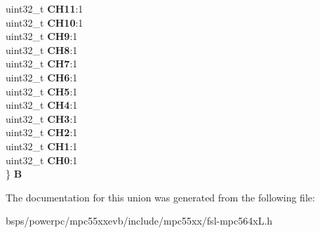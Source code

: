 \begin{DoxyCompactItemize}
\begin{tabbing}
\>uint32\_t {\bfseries CH11}:1\\
\>uint32\_t {\bfseries CH10}:1\\
\>uint32\_t {\bfseries CH9}:1\\
\>uint32\_t {\bfseries CH8}:1\\
\>uint32\_t {\bfseries CH7}:1\\
\>uint32\_t {\bfseries CH6}:1\\
\>uint32\_t {\bfseries CH5}:1\\
\>uint32\_t {\bfseries CH4}:1\\
\>uint32\_t {\bfseries CH3}:1\\
\>uint32\_t {\bfseries CH2}:1\\
\>uint32\_t {\bfseries CH1}:1\\
\>uint32\_t {\bfseries CH0}:1\\
\} {\bfseries B}\\

\end{tabbing}\end{DoxyCompactItemize}


The documentation for this union was generated from the following file\+:\begin{DoxyCompactItemize}
\item 
bsps/powerpc/mpc55xxevb/include/mpc55xx/fsl-\/mpc564x\+L.\+h\end{DoxyCompactItemize}
